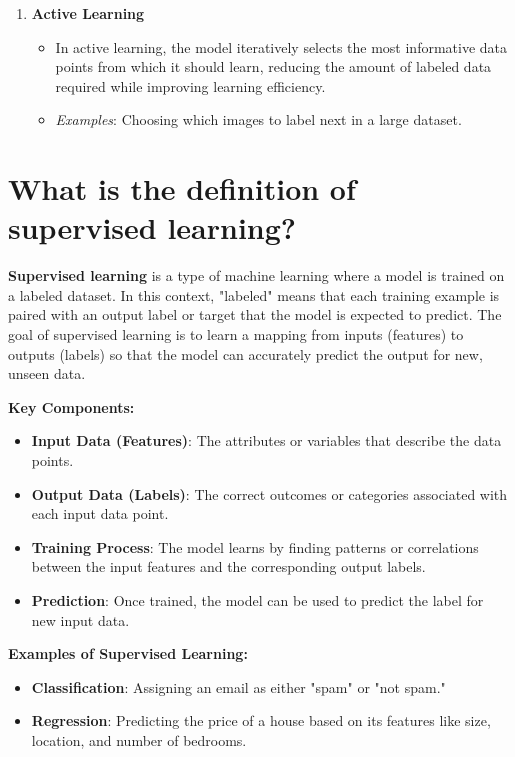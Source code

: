 \documentclass{article}
\begin{document}
\begin{enumerate}
    \item \textbf{Active Learning}
    \begin{itemize}
        \item In active learning, the model iteratively selects the most informative data points from which it should learn, reducing the amount of labeled data required while improving learning efficiency.
        \item \textit{Examples}: Choosing which images to label next in a large dataset.
    \end{itemize}
\end{enumerate}

\section{What is the definition of supervised learning?}
\textbf{Supervised learning} is a type of machine learning where a model is trained on a labeled dataset. In this context, "labeled" means that each training example is paired with an output label or target that the model is expected to predict. The goal of supervised learning is to learn a mapping from inputs (features) to outputs (labels) so that the model can accurately predict the output for new, unseen data.

\textbf{Key Components:}
\begin{itemize}
    \item \textbf{Input Data (Features)}: The attributes or variables that describe the data points.
    \item \textbf{Output Data (Labels)}: The correct outcomes or categories associated with each input data point.
    \item \textbf{Training Process}: The model learns by finding patterns or correlations between the input features and the corresponding output labels.
    \item \textbf{Prediction}: Once trained, the model can be used to predict the label for new input data.
\end{itemize}

\textbf{Examples of Supervised Learning:}
\begin{itemize}
    \item \textbf{Classification}: Assigning an email as either "spam" or "not spam."
    \item \textbf{Regression}: Predicting the price of a house based on its features like size, location, and number of bedrooms.
\end{itemize}
\end{document}
